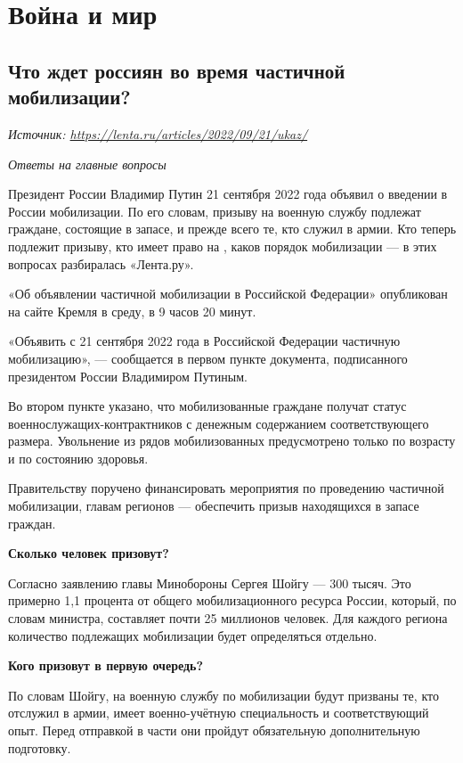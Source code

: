 \chapter{Война и мир}

\section{Что ждет россиян во время частичной мобилизации?}
\textit{Источник: \url{https://lenta.ru/articles/2022/09/21/ukaz/}}

\textit{Ответы на главные вопросы}

Президент России Владимир Путин 21 сентября 2022 года объявил о введении в России  мобилизации. По его словам, призыву на военную службу подлежат граждане, состоящие в запасе, и прежде всего те, кто служил в армии. Кто теперь подлежит призыву, кто имеет право на , каков порядок мобилизации — в этих вопросах разбиралась «Лента.ру».

 «Об объявлении частичной мобилизации в Российской Федерации» опубликован на сайте Кремля в среду, в 9 часов 20 минут.

«Объявить с 21 сентября 2022 года в Российской Федерации частичную мобилизацию», — сообщается в первом пункте документа, подписанного президентом России Владимиром Путиным.

Во втором пункте указано, что мобилизованные граждане получат статус военнослужащих-контрактников с денежным содержанием соответствующего размера. Увольнение из рядов мобилизованных предусмотрено только по возрасту и по состоянию здоровья.

Правительству поручено финансировать мероприятия по проведению частичной мобилизации, главам регионов — обеспечить призыв находящихся в запасе граждан.

\textbf{Сколько человек призовут?}

Согласно заявлению главы Минобороны Сергея Шойгу — 300 тысяч. Это примерно 1,1 процента от общего мобилизационного ресурса России, который, по словам министра, составляет почти 25 миллионов человек. Для каждого региона количество подлежащих мобилизации будет определяться отдельно.

\textbf{Кого призовут в первую очередь?}

По словам Шойгу, на военную службу по мобилизации будут призваны те, кто отслужил в армии, имеет военно-учётную специальность и соответствующий опыт. Перед отправкой в части они пройдут обязательную дополнительную подготовку.

